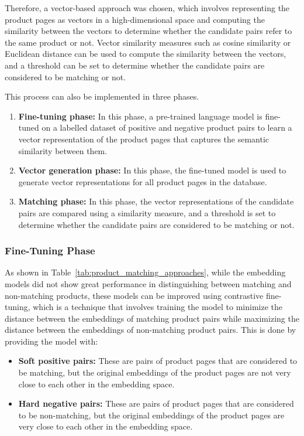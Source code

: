 Therefore, a vector-based approach was chosen, which involves representing the product pages as vectors in a high-dimensional space and computing the similarity between the vectors to determine whether the candidate pairs refer to the same product or not.
Vector similarity measures such as cosine similarity or Euclidean distance can be used to compute the similarity between the vectors, and a threshold can be set to determine whether the candidate pairs are considered to be matching or not.

This process can also be implemented in three phases.
\begin{enumerate}
    \item \textbf{Fine-tuning phase:} In this phase, a pre-trained language model is fine-tuned on a labelled dataset of positive and negative product pairs to learn a vector representation of the product pages that captures the semantic similarity between them.
    \item \textbf{Vector generation phase:} In this phase, the fine-tuned model is used to generate vector representations for all product pages in the database.
    \item \textbf{Matching phase:} In this phase, the vector representations of the candidate pairs are compared using a similarity measure, and a threshold is set to determine whether the candidate pairs are considered to be matching or not.
\end{enumerate}

\subsubsection{Fine-Tuning Phase}\label{subsubsec:sec_product_matching_fine_tuning_phase}

As shown in Table~\ref{tab:product_matching_approaches}, while the embedding models did not show great performance in distinguishing between matching and non-matching products, these models can be improved using contrastive fine-tuning, which is a technique that involves training the model to minimize the distance between the embeddings of matching product pairs while maximizing the distance between the embeddings of non-matching product pairs.
This is done by providing the model with:
\begin{itemize}
    \item \textbf{Soft positive pairs:} These are pairs of product pages that are considered to be matching, but the original embeddings of the product pages are not very close to each other in the embedding space.
    \item \textbf{Hard negative pairs:} These are pairs of product pages that are considered to be non-matching, but the original embeddings of the product pages are very close to each other in the embedding space.
\end{itemize}

